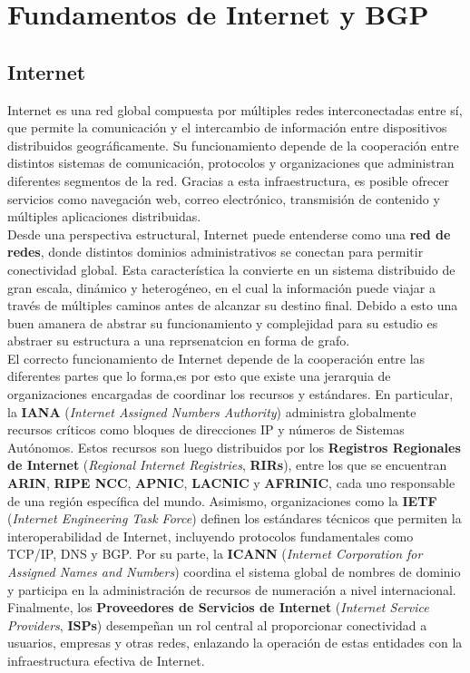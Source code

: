 \section{Fundamentos de Internet y BGP} \label{sec:anexo_fundamentos_internet_bgp}


\subsection{Internet} \label{sec:anexo_internet}

Internet es una red global compuesta por múltiples redes interconectadas entre sí, que permite la comunicación y el intercambio de información entre dispositivos distribuidos geográficamente. 
Su funcionamiento depende de la cooperación entre distintos sistemas de comunicación, protocolos y organizaciones que administran diferentes segmentos de la red. 
Gracias a esta infraestructura, es posible ofrecer servicios como navegación web, correo electrónico, transmisión de contenido y múltiples aplicaciones distribuidas.\\


Desde una perspectiva estructural, Internet puede entenderse como una \textbf{red de redes}, donde distintos dominios administrativos se conectan para permitir conectividad global. 
Esta característica la convierte en un sistema distribuido de gran escala, dinámico y heterogéneo, en el cual la información puede viajar a través de múltiples caminos antes de 
alcanzar su destino final. Debido a esto una buen amanera de abstrar su funcionamiento y complejidad para su estudio es abstraer su estructura a una reprsenatcion en forma de grafo.\\


El correcto funcionamiento de Internet depende de la cooperación entre las diferentes partes que lo forma,es por esto que existe una jerarquia de organizaciones encargadas de coordinar los recursos y estándares. En particular, la \textbf{IANA} (\textit{Internet Assigned Numbers Authority}) 
administra globalmente recursos críticos como bloques de direcciones IP y números de Sistemas Autónomos. Estos recursos son luego distribuidos por los \textbf{Registros Regionales de Internet} 
(\textit{Regional Internet Registries}, \textbf{RIRs}), entre los que se encuentran \textbf{ARIN}, \textbf{RIPE NCC}, \textbf{APNIC}, \textbf{LACNIC} y \textbf{AFRINIC}, cada uno responsable 
de una región específica del mundo.
Asimismo, organizaciones como la \textbf{IETF} (\textit{Internet Engineering Task Force}) definen los estándares técnicos que permiten la interoperabilidad de Internet, incluyendo protocolos 
fundamentales como TCP/IP, DNS y BGP. Por su parte, la \textbf{ICANN} (\textit{Internet Corporation for Assigned Names and Numbers}) coordina el sistema global de nombres de dominio y participa 
en la administración de recursos de numeración a nivel internacional. Finalmente, los \textbf{Proveedores de Servicios de Internet} (\textit{Internet Service Providers}, \textbf{ISPs}) desempeñan 
un rol central al proporcionar conectividad a usuarios, empresas y otras redes, enlazando la operación de estas entidades con la infraestructura efectiva de Internet.\\


